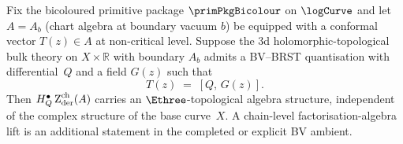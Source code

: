 \begin{construction}
\label{constr:topologization}
Fix the bicoloured primitive package $\primPkgBicolour$ on $\logCurve$
and let $A = A_b$ (chart algebra at boundary vacuum $b$) be equipped
with a conformal vector $T(z) \in A$ at non-critical level. Suppose
the $3$d holomorphic-topological bulk theory on $X \times \mathbb{R}$
with boundary $A_b$ admits a BV--BRST quantisation with differential~$Q$
and a field $G(z)$ such that
\begin{equation}\label{eq:sugawara-Q-exact}
T(z) \;=\; [Q,\, G(z)].
\end{equation}
Then $H_Q^\bullet\operatorname{Z}_{\mathrm{der}}^{\mathrm{ch}}(A)$ carries an
$\Ethree$-topological algebra structure, independent of the
complex structure of the base curve~$X$. A chain-level
factorisation-algebra lift is an additional statement in the
completed or explicit BV ambient.
\end{construction}

